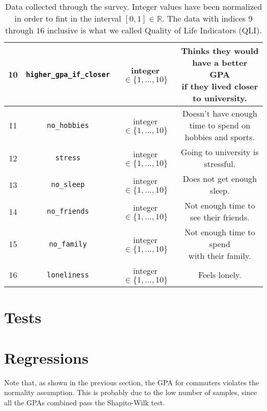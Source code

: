 \documentclass[12pt]{extarticle}
\numberwithin{table}{section}
\numberwithin{figure}{section}
\newcommand{\R}{\mathds{R}}
\numberwithin{equation}{section}
\begin{document}
\begin{table}[H]
\begin{center}
\begin{tabular}{|c|c|c|c|}
			\hline
			10         & \texttt{higher\_gpa\_if\_closer} & integer $\in \{1, \dots, 10\}$ & \makecell{Thinks they would have a better GPA  \\ if they lived closer to university.} \\
			\hline
			11         & \texttt{no\_hobbies}             & integer $\in \{1, \dots, 10\}$ & \makecell{Doesn't have enough time to spend on \\ hobbies and sports.} \\
			\hline
			12         & \texttt{stress}                  & integer $\in \{1, \dots, 10\}$ & Going to university is stressful.              \\
			\hline
			13         & \texttt{no\_sleep}               & integer $\in \{1, \dots, 10\}$ & Does not get enough sleep.                     \\
			\hline
			14         & \texttt{no\_friends}             & integer $\in \{1, \dots, 10\}$ & Not enough time to see their friends.          \\
			\hline
			15         & \texttt{no\_family}              & integer $\in \{1, \dots, 10\}$ & \makecell{Not enough time to spend             \\ with their family.}    \\
			\hline
			16         & \texttt{loneliness}              & integer $\in \{1, \dots, 10\}$ & Feels lonely.                                  \\
			\hline
		\end{tabular}
		\caption{
			Data collected through the survey.
			Integer values have been normalized in order to fint in the interval $[0,1] \in \R$.
			The data with indices $9$ through $16$ inclusive is what we called Quality of Life Indicators (QLI).
		}
	\end{center}
\end{table}

\section{Tests}

\section{Regressions}

Note that, as shown in the previous section, the GPA for commuters violates the normality assumption.
This is probably due to the low number of samples, since all the GPAs combined pass the Shapito-Wilk test.
\end{document}
